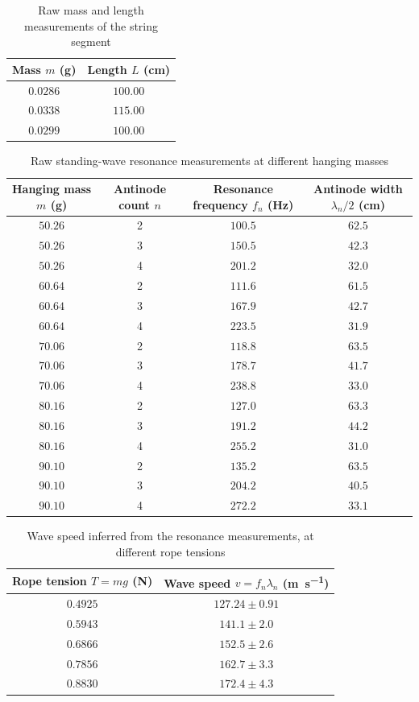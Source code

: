 \begin{table}[htb!]
\centering
\caption{Raw mass and length measurements of the string segment}
\begin{tabular}{cc}
\toprule
Mass $m$ (\unit{\g}) & Length $L$ (\unit{\cm}) \\
\midrule
$0.0286$ & $100.00$ \\
$0.0338$ & $115.00$ \\
$0.0299$ & $100.00$ \\
\bottomrule
\end{tabular}
\end{table}
\begin{table}[htb!]
\centering
\caption{Raw standing-wave resonance measurements at different hanging masses}
\begin{tabular}{cccc}
\toprule
Hanging mass $m$ (\unit{\g}) & Antinode count $n$ & Resonance frequency $f_{n}$ (\unit{\Hz}) & Antinode width $\lambda_{n}/2$ (\unit{\cm}) \\
\midrule
$50.26$ & 2 & $100.5$ & $62.5$ \\
$50.26$ & 3 & $150.5$ & $42.3$ \\
$50.26$ & 4 & $201.2$ & $32.0$ \\
$60.64$ & 2 & $111.6$ & $61.5$ \\
$60.64$ & 3 & $167.9$ & $42.7$ \\
$60.64$ & 4 & $223.5$ & $31.9$ \\
$70.06$ & 2 & $118.8$ & $63.5$ \\
$70.06$ & 3 & $178.7$ & $41.7$ \\
$70.06$ & 4 & $238.8$ & $33.0$ \\
$80.16$ & 2 & $127.0$ & $63.3$ \\
$80.16$ & 3 & $191.2$ & $44.2$ \\
$80.16$ & 4 & $255.2$ & $31.0$ \\
$90.10$ & 2 & $135.2$ & $63.5$ \\
$90.10$ & 3 & $204.2$ & $40.5$ \\
$90.10$ & 4 & $272.2$ & $33.1$ \\
\bottomrule
\end{tabular}
\end{table}
\begin{table}[htb!]
\centering
\caption{Wave speed inferred from the resonance measurements, at different rope tensions}
\begin{tabular}{cc}
\toprule
Rope tension $T=mg$ (\unit{\N}) & Wave speed $v=f_{n}\lambda_{n}$ (\unit{\m\per\s}) \\
\midrule
$0.4925$ & $127.24 \pm 0.91$ \\
$0.5943$ & $141.1 \pm 2.0$ \\
$0.6866$ & $152.5 \pm 2.6$ \\
$0.7856$ & $162.7 \pm 3.3$ \\
$0.8830$ & $172.4 \pm 4.3$ \\
\bottomrule
\end{tabular}
\end{table}

